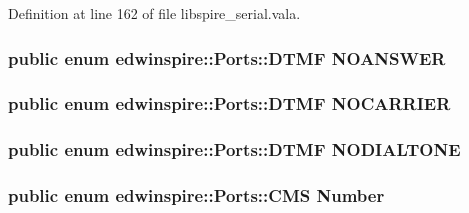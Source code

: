 Definition at line 162 of file libspire\-\_\-serial.\-vala.

\hypertarget{namespaceedwinspire_1_1_ports_a7b95c55cd0d61c0352039c017a0fe263}{
\subsubsection[{N\-O\-A\-N\-S\-W\-E\-R}]{\setlength{\rightskip}{0pt plus 5cm}public enum {\bf edwinspire\-::\-Ports\-::\-D\-T\-M\-F}
			 N\-O\-A\-N\-S\-W\-E\-R}}\label{namespaceedwinspire_1_1_ports_a7b95c55cd0d61c0352039c017a0fe263}
\hypertarget{namespaceedwinspire_1_1_ports_ad4606903009920c6acc09144a51f91cf}{
\subsubsection[{N\-O\-C\-A\-R\-R\-I\-E\-R}]{\setlength{\rightskip}{0pt plus 5cm}public enum {\bf edwinspire\-::\-Ports\-::\-D\-T\-M\-F}
			 N\-O\-C\-A\-R\-R\-I\-E\-R}}\label{namespaceedwinspire_1_1_ports_ad4606903009920c6acc09144a51f91cf}
\hypertarget{namespaceedwinspire_1_1_ports_aeeca1b6e1c383f62758a51f1307c8638}{
\subsubsection[{N\-O\-D\-I\-A\-L\-T\-O\-N\-E}]{\setlength{\rightskip}{0pt plus 5cm}public enum {\bf edwinspire\-::\-Ports\-::\-D\-T\-M\-F}
			 N\-O\-D\-I\-A\-L\-T\-O\-N\-E}}\label{namespaceedwinspire_1_1_ports_aeeca1b6e1c383f62758a51f1307c8638}
\hypertarget{namespaceedwinspire_1_1_ports_a22f616818dc85fd8ee4b9f3821546acb}{
\subsubsection[{Number}]{\setlength{\rightskip}{0pt plus 5cm}public enum {\bf edwinspire\-::\-Ports\-::\-C\-M\-S} Number}}\label{namespaceedwinspire_1_1_ports_a22f616818dc85fd8ee4b9f3821546acb}
